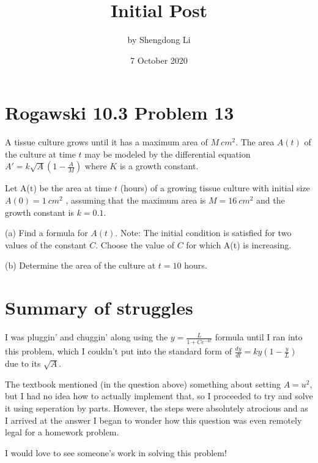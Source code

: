 \documentclass[12pt]{article}
\begin{document}
\title{Initial Post}
\author{by Shengdong Li}
\date{7 October 2020}
\maketitle

\section{Rogawski 10.3 Problem 13}

A tissue culture grows until it has a maximum area of $M\:cm^2$. The area $A(t)$ of the culture at time $t$ may be modeled by the differential equation $A'=k\sqrt{A}\left(1-\frac{A}{M}\right)$ where $K$ is a growth constant.


Let A(t) be the area at time $t$ (hours) of a growing tissue culture with initial size $A(0) = 1\:cm^2$ , assuming that the maximum area is $M = 16\:cm^2$ and the growth constant
is $k = 0.1$.

\bigskip

(a) Find a formula for $A(t)$. Note: The initial condition is satisfied for
two values of the constant $C$. Choose the value of $C$ for which A(t) is
increasing.

(b) Determine the area of the culture at $t = 10$ hours.

\section{Summary of struggles}

I was pluggin' and chuggin' along using the $y=\frac{L}{1+Ce^{-kt}}$ formula until I ran into this problem, which I couldn't put into the standard form of $\frac{dy}{dt}=ky\left(1-\frac{y}{L}\right)$ due to its $\sqrt{A}$.

The textbook mentioned (in the question above) something about setting $A=u^2$, but I had no idea how to actually implement that, so I proceeded to try and solve it using seperation by parts. However, the steps were absolutely atrocious and as I arrived at the answer I began to wonder how this question was even remotely legal for a homework problem.

\bigskip

I would love to see someone's work in solving this problem!
\end{document}
